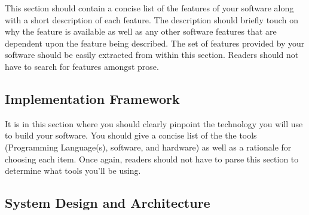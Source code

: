 \documentclass[10pt]{article}
\begin{document}
This section should contain a concise list of the features of your software along with a short description of each feature.  The description should briefly touch on why the feature is available as well as any other software features that are dependent upon the feature being described.  The set of features provided by your software should be easily extracted from within this section.  Readers should not have to search for features amongst prose.  


\subsection{Implementation Framework}

It is in this section where you should clearly pinpoint the technology you will use to build your software.  You should give a concise list of the the tools (Programming Language(s), software, and hardware) as well as a rationale for choosing each item. Once again, readers should not have to parse this section to determine what tools you'll be using. 

\subsection{System Design and Architecture}
\end{document}
